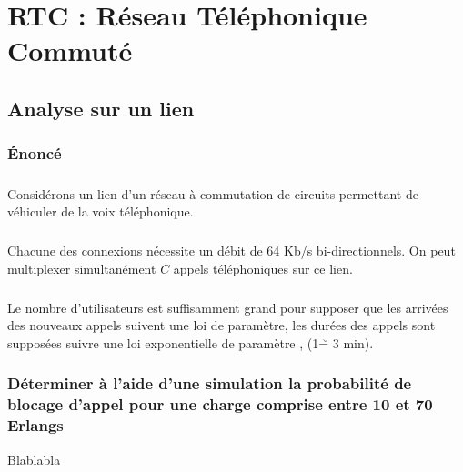 %
\chapter{RTC : Réseau Téléphonique Commuté}
%
    \section{Analyse sur un lien}
%
        \subsection{Énoncé}
%
            \paragraph{}
Considérons un lien d'un réseau à commutation de circuits permettant de véhiculer de la voix téléphonique.
%
            \paragraph{}
Chacune des connexions nécessite un débit de 64 Kb/s bi-directionnels.
On peut multiplexer simultanément $C$ appels téléphoniques sur ce lien.
%
        \paragraph{}
        Le nombre d'utilisateurs est suffisamment grand pour supposer que les arrivées des nouveaux appels suivent une loi de paramètre, les durées des appels sont supposées suivre une loi exponentielle de paramètre , (1\u = 3 min).
%
        \subsection{Déterminer à l'aide d'une simulation la probabilité de blocage d'appel pour une charge comprise entre 10 et 70 Erlangs}
Blablabla
%
